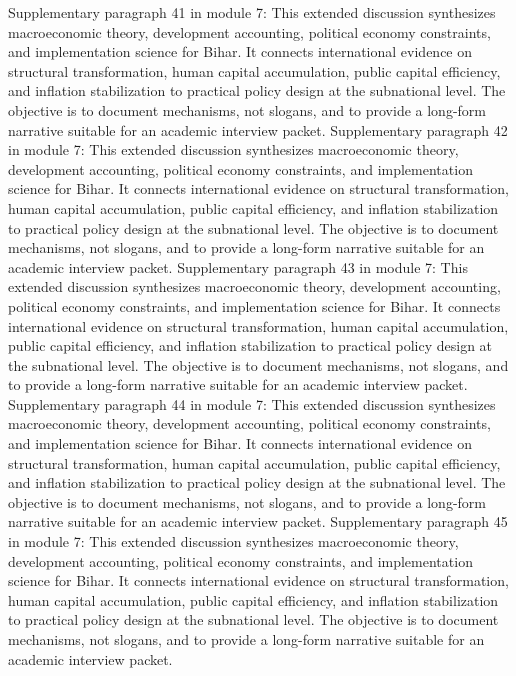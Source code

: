 \documentclass[preprint,12pt]{elsarticle}
\begin{document}
Supplementary paragraph 41 in module 7: This extended discussion synthesizes macroeconomic theory, development accounting, political economy constraints, and implementation science for Bihar. It connects international evidence on structural transformation, human capital accumulation, public capital efficiency, and inflation stabilization to practical policy design at the subnational level. The objective is to document mechanisms, not slogans, and to provide a long-form narrative suitable for an academic interview packet.
Supplementary paragraph 42 in module 7: This extended discussion synthesizes macroeconomic theory, development accounting, political economy constraints, and implementation science for Bihar. It connects international evidence on structural transformation, human capital accumulation, public capital efficiency, and inflation stabilization to practical policy design at the subnational level. The objective is to document mechanisms, not slogans, and to provide a long-form narrative suitable for an academic interview packet.
Supplementary paragraph 43 in module 7: This extended discussion synthesizes macroeconomic theory, development accounting, political economy constraints, and implementation science for Bihar. It connects international evidence on structural transformation, human capital accumulation, public capital efficiency, and inflation stabilization to practical policy design at the subnational level. The objective is to document mechanisms, not slogans, and to provide a long-form narrative suitable for an academic interview packet.
Supplementary paragraph 44 in module 7: This extended discussion synthesizes macroeconomic theory, development accounting, political economy constraints, and implementation science for Bihar. It connects international evidence on structural transformation, human capital accumulation, public capital efficiency, and inflation stabilization to practical policy design at the subnational level. The objective is to document mechanisms, not slogans, and to provide a long-form narrative suitable for an academic interview packet.
Supplementary paragraph 45 in module 7: This extended discussion synthesizes macroeconomic theory, development accounting, political economy constraints, and implementation science for Bihar. It connects international evidence on structural transformation, human capital accumulation, public capital efficiency, and inflation stabilization to practical policy design at the subnational level. The objective is to document mechanisms, not slogans, and to provide a long-form narrative suitable for an academic interview packet.
\end{document}
